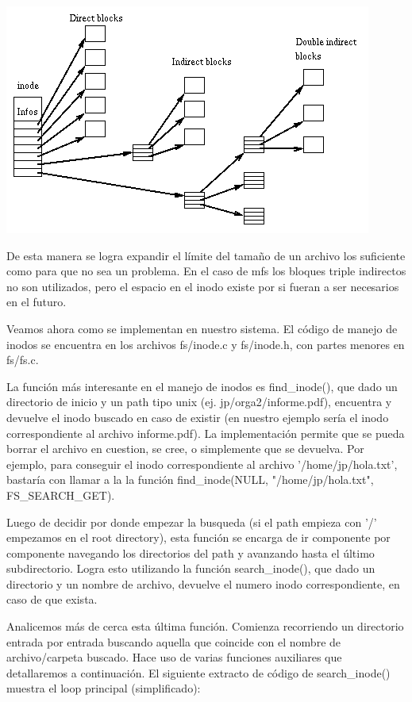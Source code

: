 \begin{center}
\includegraphics[scale=0.62]{../img/inode_links.png}
\end{center}

De esta manera se logra expandir el límite del tamaño de un archivo los
suficiente como para que no sea un problema. En el caso de mfs los bloques
triple indirectos no son utilizados, pero el espacio en el inodo existe por si
fueran a ser necesarios en el futuro.

Veamos ahora como se implementan en nuestro sistema. El código de manejo de
inodos se encuentra en los archivos fs/inode.c y fs/inode.h, con partes menores
en fs/fs.c.

La función más interesante en el manejo de inodos es find\_inode(), que dado un
directorio de inicio y un path tipo unix (ej. jp/orga2/informe.pdf), encuentra y
devuelve el inodo buscado en caso de existir (en nuestro ejemplo sería el inodo
correspondiente al archivo informe.pdf). La implementación permite que se pueda
borrar el archivo en cuestion, se cree, o simplemente que se devuelva. Por
ejemplo, para conseguir el inodo correspondiente al archivo '/home/jp/hola.txt',
bastaría con llamar a la la función find\_inode(NULL, "/home/jp/hola.txt",
FS\_SEARCH\_GET).

Luego de decidir por donde empezar la busqueda (si el path empieza con '/'
empezamos en el root directory), esta función se encarga de ir componente por
componente navegando los directorios del path y avanzando hasta el último
subdirectorio. Logra esto utilizando la función search\_inode(), que dado un
directorio y un nombre de archivo, devuelve el numero inodo correspondiente, en
caso de que exista.

Analicemos más de cerca esta última función. Comienza recorriendo un
directorio entrada por entrada buscando aquella que coincide con el nombre de
archivo/carpeta buscado. Hace uso de varias funciones auxiliares que
detallaremos a continuación. El siguiente extracto de código de search\_inode()
muestra el loop principal (simplificado):

